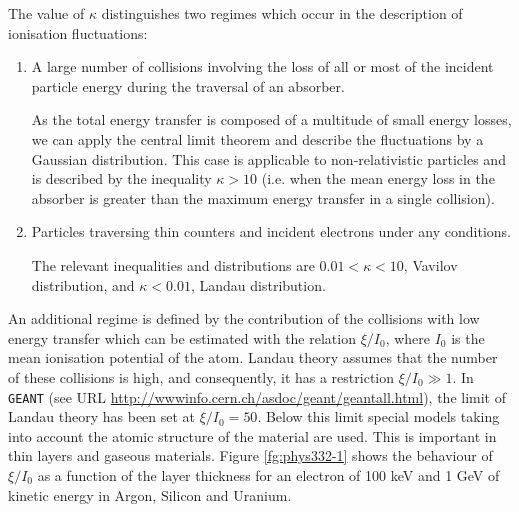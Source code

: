 \documentclass{article}
\newcommand{\GEANT}{\texttt{GEANT}}
\begin{document}
The value of $\kappa$ distinguishes two regimes which occur in the
description of ionisation fluctuations:
 
\begin{enumerate}
\item A large number of collisions involving the loss of all or most
  of the incident particle energy during the traversal of an absorber.
  
  As the total energy transfer is composed of a multitude of small
  energy losses, we can apply the central limit theorem and describe
  the fluctuations by a Gaussian distribution.  This case is
  applicable to non-relativistic particles and is described by the
  inequality $\kappa > 10 $ (i.e. when the mean energy loss in the
  absorber is greater than the maximum energy transfer in a single
  collision).
  
\item Particles traversing thin counters and incident electrons under
  any conditions.
  
  The relevant inequalities and distributions are $ 0.01 < \kappa < 10
  $, Vavilov distribution, and $\kappa < 0.01 $, Landau distribution.
\end{enumerate}

An additional regime is defined by the contribution of the collisions
with low energy transfer which can be estimated with the relation
$\xi/I_0$, where $I_0$ is the mean ionisation potential of the atom.
Landau theory assumes that the number of these collisions is high, and
consequently, it has a restriction $\xi/I_0 \gg 1$.  In \GEANT{}
(see URL \url{http://wwwinfo.cern.ch/asdoc/geant/geantall.html}), the
limit of Landau theory has been set at $\xi/I_0 = 50$.  Below this
limit special models taking into account the atomic structure of the
material are used.  This is important in thin layers and gaseous
materials.  Figure \ref{fg:phys332-1} shows the behaviour of $\xi/I_0$
as a function of the layer thickness for an electron of 100 keV and 1
GeV of kinetic energy in Argon, Silicon and Uranium.
\end{document}
